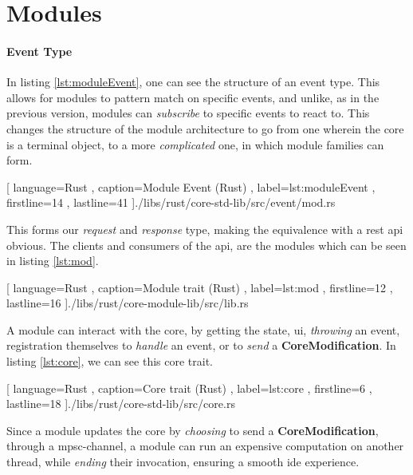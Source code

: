 \section{Modules} \label{sec:modules}

\paragraph{Event Type} In listing \ref{lst:moduleEvent}, one can see the
structure of an event type. This allows for modules to pattern match on specific
events, and unlike, as in the previous version, modules can \textit{subscribe}
to specific events to react to. This changes the structure of the module
architecture to go from one wherein the core is a terminal object, to a more
\textit{complicated} one, in which module families can form.

\begin{center}
  
    [ language=Rust
    , caption={Module Event (Rust)}
    , label=lst:moduleEvent
    , firstline=14
    , lastline=41
    ]{./libs/rust/core-std-lib/src/event/mod.rs}
\end{center}

This forms our \textit{request} and \textit{response} type, making the
equivalence with a \gls*{rest} \gls*{api} obvious. The clients and consumers
of the \gls*{api}, are the modules which can be seen in listing \ref{lst:mod}.

\begin{center}
  
    [ language=Rust
    , caption={Module trait (Rust)}
    , label=lst:mod
    , firstline=12
    , lastline=16
    ]{./libs/rust/core-module-lib/src/lib.rs}
\end{center}

A module can interact with the core, by getting the state, \gls*{ui},
\textit{throwing} an event, registration themselves to \textit{handle} an
event, or to \textit{send} a \textbf{CoreModification}. In listing
\ref{lst:core}, we can see this core trait.

\begin{center}
  
    [ language=Rust
    , caption={Core trait (Rust)}
    , label=lst:core
    , firstline=6
    , lastline=18
    ]{./libs/rust/core-std-lib/src/core.rs}
\end{center}

Since a module updates the core by \textit{choosing} to send a
\textbf{CoreModification}, through a \gls*{mpsc}-channel, a module can run an
expensive computation on another thread, while \textit{ending} their
invocation, ensuring a smooth \gls*{ide} experience.


